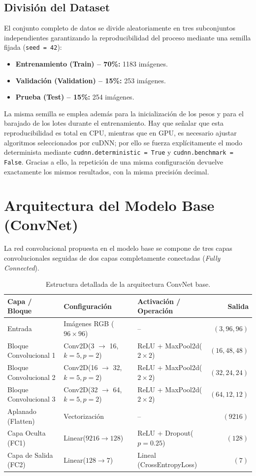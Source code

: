 \documentclass[11pt, a4paper]{article}
\begin{document}
\subsection{División del Dataset}
El conjunto completo de datos se divide aleatoriamente en tres subconjuntos independientes garantizando la reproducibilidad del proceso mediante una semilla fijada (\texttt{seed = 42}):
\begin{itemize}
    \item \textbf{Entrenamiento (Train) -- 70\%:} 1183 imágenes.
    \item \textbf{Validación (Validation) -- 15\%:} 253 imágenes.
    \item \textbf{Prueba (Test) -- 15\%:} 254 imágenes.
\end{itemize}

La misma semilla se emplea además para la inicialización de los pesos y para el barajado de los lotes durante el entrenamiento. Hay que señalar que esta reproducibilidad es total en CPU, mientras que en GPU, es necesario ajustar algoritmos seleccionados por cuDNN; por ello se fuerza explícitamente el modo determinista mediante \texttt{cudnn.deterministic = True} y \texttt{cudnn.benchmark = False}. Gracias a ello, la repetición de una misma configuración devuelve exactamente los mismos resultados, con la misma precisión decimal.

\section{Arquitectura del Modelo Base (ConvNet)}
La red convolucional propuesta en el modelo base se compone de tres capas convolucionales seguidas de dos capas completamente conectadas (\textit{Fully Connected}).

\begin{table}[H]
\centering
\caption{Estructura detallada de la arquitectura ConvNet base.}
\label{tab:arquitectura}
\begin{tabularx}{\linewidth}{>{\raggedright\arraybackslash}X l l r}
\toprule
\textbf{Capa / Bloque} & \textbf{Configuración} & \textbf{Activación / Operación} & \textbf{Salida} \\
\midrule
Entrada & Imágenes RGB ($96 \times 96$) & -- & $(3, 96, 96)$ \\
Bloque Convolucional 1 & Conv2D(3 $\rightarrow$ 16, $k=5, p=2$) & ReLU + MaxPool2d($2 \times 2$) & $(16, 48, 48)$ \\
Bloque Convolucional 2 & Conv2D(16 $\rightarrow$ 32, $k=5, p=2$) & ReLU + MaxPool2d($2 \times 2$) & $(32, 24, 24)$ \\
Bloque Convolucional 3 & Conv2D(32 $\rightarrow$ 64, $k=5, p=2$) & ReLU + MaxPool2d($2 \times 2$) & $(64, 12, 12)$ \\
Aplanado (Flatten) & Vectorización & -- & $(9216)$ \\
Capa Oculta (FC1) & Linear($9216 \rightarrow 128$) & ReLU + Dropout($p=0.25$) & $(128)$ \\
Capa de Salida (FC2) & Linear($128 \rightarrow 7$) & Lineal (CrossEntropyLoss) & $(7)$ \\
\bottomrule
\end{tabularx}
\end{table}
\end{document}
